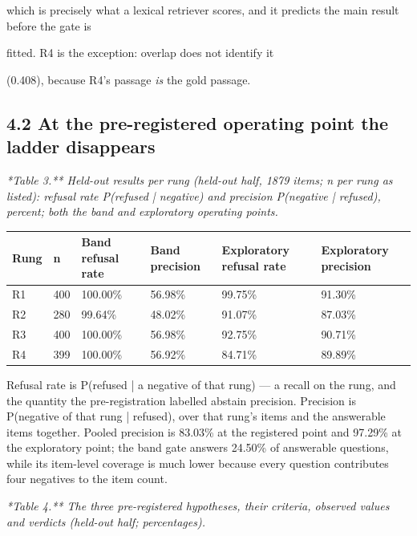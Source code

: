 which is precisely what a lexical retriever scores, and it predicts the main result before the gate is

fitted. R4 is the exception: overlap does not identify it

(0.408), because R4's passage \textit{is} the gold passage.

\subsection{4.2 At the pre-registered operating point the ladder disappears}
\textit{*Table 3.** Held-out results per rung (held-out half, 1879 items; n per rung as listed): refusal rate P(refused | negative) and precision P(negative | refused), percent; both the band and exploratory operating points.}

\begin{table}[t]
\centering
\scriptsize
  \begin{tabularx}{\textwidth}{lXXXXX}
    \toprule
    Rung & n & Band refusal rate & Band precision & Exploratory refusal rate & Exploratory precision \\
\midrule
    R1 & 400 & 100.00\% & 56.98\% & 99.75\% & 91.30\% \\
    R2 & 280 & 99.64\% & 48.02\% & 91.07\% & 87.03\% \\
    R3 & 400 & 100.00\% & 56.98\% & 92.75\% & 90.71\% \\
    R4 & 399 & 100.00\% & 56.92\% & 84.71\% & 89.89\% \\
    \bottomrule
  \end{tabularx}
\end{table}
Refusal rate is P(refused | a negative of that rung) --- a recall on the rung, and the quantity the pre-registration labelled abstain precision. Precision is P(negative of that rung | refused), over that rung's items and the answerable items together. Pooled precision is 83.03\% at the registered point and 97.29\% at the exploratory point; the band gate answers 24.50\% of answerable questions, while its item-level coverage is much lower because every question contributes four negatives to the item count.

\textit{*Table 4.** The three pre-registered hypotheses, their criteria, observed values and verdicts (held-out half; percentages).}


